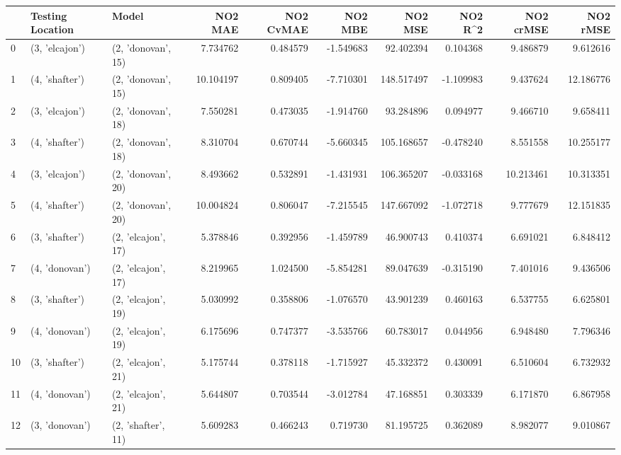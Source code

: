 \begin{tabular}{lllrrrrrrr}
\toprule
{} & Testing Location &               Model &    NO2 MAE &  NO2 CvMAE &   NO2 MBE &      NO2 MSE &    NO2 R\textasciicircum2 &  NO2 crMSE &   NO2 rMSE \\
\midrule
0  &   (3, 'elcajon') &  (2, 'donovan', 15) &   7.734762 &   0.484579 & -1.549683 &    92.402394 &   0.104368 &   9.486879 &   9.612616 \\
1  &   (4, 'shafter') &  (2, 'donovan', 15) &  10.104197 &   0.809405 & -7.710301 &   148.517497 &  -1.109983 &   9.437624 &  12.186776 \\
2  &   (3, 'elcajon') &  (2, 'donovan', 18) &   7.550281 &   0.473035 & -1.914760 &    93.284896 &   0.094977 &   9.466710 &   9.658411 \\
3  &   (4, 'shafter') &  (2, 'donovan', 18) &   8.310704 &   0.670744 & -5.660345 &   105.168657 &  -0.478240 &   8.551558 &  10.255177 \\
4  &   (3, 'elcajon') &  (2, 'donovan', 20) &   8.493662 &   0.532891 & -1.431931 &   106.365207 &  -0.033168 &  10.213461 &  10.313351 \\
5  &   (4, 'shafter') &  (2, 'donovan', 20) &  10.004824 &   0.806047 & -7.215545 &   147.667092 &  -1.072718 &   9.777679 &  12.151835 \\
6  &   (3, 'shafter') &  (2, 'elcajon', 17) &   5.378846 &   0.392956 & -1.459789 &    46.900743 &   0.410374 &   6.691021 &   6.848412 \\
7  &   (4, 'donovan') &  (2, 'elcajon', 17) &   8.219965 &   1.024500 & -5.854281 &    89.047639 &  -0.315190 &   7.401016 &   9.436506 \\
8  &   (3, 'shafter') &  (2, 'elcajon', 19) &   5.030992 &   0.358806 & -1.076570 &    43.901239 &   0.460163 &   6.537755 &   6.625801 \\
9  &   (4, 'donovan') &  (2, 'elcajon', 19) &   6.175696 &   0.747377 & -3.535766 &    60.783017 &   0.044956 &   6.948480 &   7.796346 \\
10 &   (3, 'shafter') &  (2, 'elcajon', 21) &   5.175744 &   0.378118 & -1.715927 &    45.332372 &   0.430091 &   6.510604 &   6.732932 \\
11 &   (4, 'donovan') &  (2, 'elcajon', 21) &   5.644807 &   0.703544 & -3.012784 &    47.168851 &   0.303339 &   6.171870 &   6.867958 \\
12 &   (3, 'donovan') &  (2, 'shafter', 11) &   5.609283 &   0.466243 &  0.719730 &    81.195725 &   0.362089 &   8.982077 &   9.010867 \\

\end{tabular}
